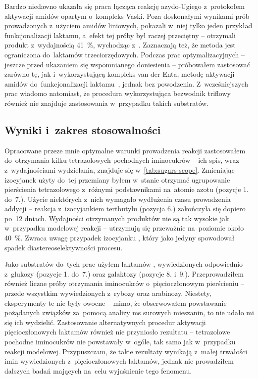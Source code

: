Bardzo niedawno ukazała się praca łącząca reakcję azydo-Ugiego z~protokołem aktywacji amidów
  opartym o~kompleks Vaski.
Poza doskonałymi wynikami prób prowadzonych z~użyciem amidów liniowych,
  \citeauthor{dixon18} pokazali w~niej tylko jeden przykład funkcjonalizacji laktamu,
  a~efekt tej próby był raczej przeciętny \--- otrzymali produkt z~wydajnością \SI{41}{\percent},
  wychodząc z~.
Zaznaczają też, że metoda jest ograniczona do~laktamów trzeciorzędowych.
Podczas prac optymalizacyjnych \--- jeszcze przed ukazaniem się wspomnianego doniesienia \---
  próbowałem zastosować zarówno tę, jak i~wykorzystującą kompleks van der Enta, metodę aktywacji
  amidów do~funkcjonalizacji laktamu~, jednak bez powodzenia.
Z~wcześniejszych prac wiadomo natomiast, że procedura wykorzystująca
  bezwodnik triflowy również nie znajduje zastosowania w~przypadku takich substratów.

\subsection{Wyniki i~zakres stosowalności}
Opracowane przeze mnie optymalne warunki prowadzenia reakcji zastosowałem do~otrzymania kilku
  tetrazolowych pochodnych iminocukrów \--- ich spis, wraz z~wydajnościami wydzielania,
  znajduje się w~\cref{tab:sugars-scope}.
Zmieniając izocyjanek użyty do~tej przemiany byłem w~stanie otrzymać ugrupowanie pierścienia
  tetrazolowego z~różnymi podstawnikami na~atomie azotu (pozycje 1. do~7.).
Użycie niektórych z~nich wymagało wydłużenia czasu prowadzenia addycji \--- reakcja z~izocyjankiem
  tertbutylu (pozycja 6.) zakończyła się dopiero po~12 dniach.
Wydajności otrzymanych produktów nie są tak wysokie jak w~przypadku modelowej reakcji \---
  utrzymują się przeważnie na~poziomie około \SI{40}{\percent}.
Zwraca uwagę przypadek izocyjanku , który jako jedyny spowodował spadek
  diastereoselektywności procesu.

Jako substratów do~tych prac użyłem laktamów , wywiedzionych
  odpowiednio z~glukozy (pozycje 1. do~7.) oraz galaktozy (pozycje 8. i~9.).
Przeprowadziłem również liczne próby otrzymania iminocukrów o~pięcioczłonowym pierścieniu \---
  przede wszystkim wywiedzionych z~rybozy oraz arabinozy.
Niestety, eksperymenty te nie były owocne \--- mimo, że obserwowałem powstawanie pożądanych
  związków za~pomocą analizy \gls{ms} surowych mieszanin, to nie udało mi się ich wydzielić.
Zastosowanie alternatywnych procedur aktywacji pięcioczłonowych laktamów również nie przyniosło
  rezultatu \--- tetrazolowe pochodne iminocukrów nie powstawały w~ogóle,
  tak samo jak w~przypadku reakcji modelowej.
Przypuszczam, że takie rezultaty wynikają z~małej trwałości imin wywiedzionych z~pięcioczłonowych
  laktamów, jednak nie prowadziłem dalszych badań mających na~celu wyjaśnienie tego fenomenu.

